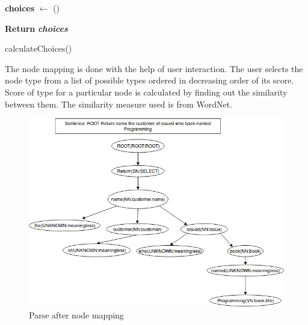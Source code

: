 \begin{algorithm}[Y]
\SetAlgoLined




\BlankLine

\textbf{choices} $\leftarrow$ ()\\


\textbf{Return} \textbf{\emph{choices}}
 \caption{calculateChoices()}
\end{algorithm}

The node mapping is done with the help of user interaction. The user selects the node type from a list of possible types ordered in decreasing order of its score. Score of type for a particular node is calculated by finding out the similarity between them. The similarity measure used is from WordNet. 




\begin{figure}[htb]
\centering
\includegraphics[scale=0.45]{./map} %
\caption{Parse after node mapping }
\label{fig:grammar} %
\end{figure}




